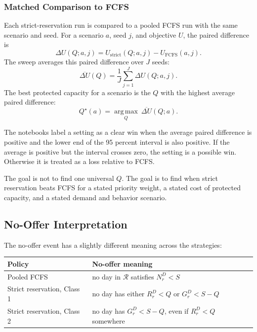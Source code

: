 \documentclass[11pt]{article}
\begin{document}
\subsubsection{Matched Comparison to FCFS}

Each strict-reservation run is compared to a pooled FCFS run with the same scenario and seed. For a
scenario \(a\), seed \(j\), and objective \(U\), the paired difference is
\[
\Delta U(Q;a,j)
=
U_{\mathrm{strict}}(Q;a,j)
-
U_{\mathrm{FCFS}}(a,j).
\]
The sweep averages this paired difference over \(J\) seeds:
\[
\overline{\Delta U}(Q)
=
\frac{1}{J}\sum_{j=1}^{J}\Delta U(Q;a,j).
\]
The best protected capacity for a scenario is the \(Q\) with the highest average paired difference:
\[
Q^\star(a)
=
\operatorname*{arg\,max}_{Q}\ \overline{\Delta U}(Q;a).
\]

The notebooks label a setting as a clear win when the average paired difference is positive and the
lower end of the 95 percent interval is also positive. If the average is positive but the interval
crosses zero, the setting is a possible win. Otherwise it is treated as a loss relative to FCFS.

\begin{keybox}[title={How to Read the Objective Analysis}]
The goal is not to find one universal \(Q\). The goal is to find when strict reservation beats FCFS
for a stated priority weight, a stated cost of protected capacity, and a stated demand and behavior
scenario.
\end{keybox}

\subsection{No-Offer Interpretation}

The no-offer event has a slightly different meaning across the strategies:
\begin{center}
\small
\begin{tabular}{L{0.25\textwidth} L{0.65\textwidth}}
\toprule
\textbf{Policy} & \textbf{No-offer meaning} \\
\midrule
Pooled FCFS & no day in \(\mathcal R\) satisfies \(N_r^D<S\) \\
\addlinespace
Strict reservation, Class 1 & no day has either \(R_r^D<Q\) or \(G_r^D<S-Q\) \\
\addlinespace
Strict reservation, Class 2 & no day has \(G_r^D<S-Q\), even if \(R_r^D<Q\) somewhere \\
\bottomrule
\end{tabular}
\normalsize
\end{center}
\end{document}
